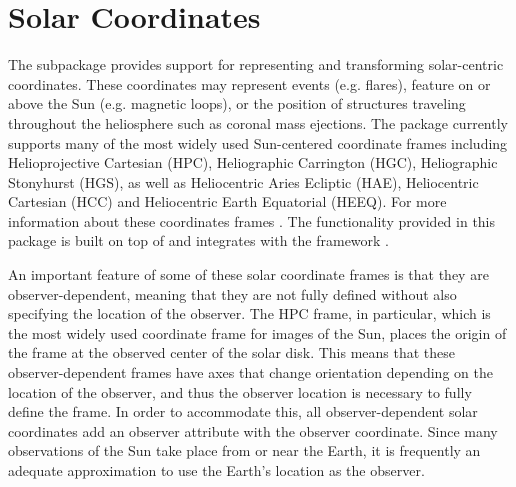 \section{Solar Coordinates}
\label{sec:coords}

The  subpackage provides support for representing and transforming solar-centric coordinates. 
These coordinates may represent events (e.g. flares), feature on or above the Sun (e.g. magnetic loops), or  the position of structures traveling throughout the heliosphere such as coronal mass ejections.
The package currently supports many of the most widely used Sun-centered coordinate frames including Helioprojective Cartesian (HPC), Heliographic Carrington (HGC), Heliographic Stonyhurst (HGS),  as well as Heliocentric Aries Ecliptic (HAE), Heliocentric Cartesian (HCC) and Heliocentric Earth Equatorial (HEEQ). 
For more information about these coordinates frames \citep[see][]{2006A&A...449..791T}.
The functionality provided in this package is built on top of and integrates with the  framework \citep[see Section 3.3 of][]{astropy2018}.

An important feature of some of these solar coordinate frames is that they are observer-dependent, meaning that they are not fully defined without also specifying the location of the observer.
The HPC frame, in particular, which is the most widely used coordinate frame for images of the Sun, places the origin of the frame at the observed center of the solar disk.
This means that these observer-dependent frames have axes that change orientation depending on the location of the observer, and thus the observer location is necessary to fully define the frame.
In order to accommodate this, all observer-dependent solar coordinates add an observer attribute with the observer coordinate.
Since many observations of the Sun take place from or near the Earth, it is frequently an adequate approximation to use the Earth's location as the observer.

